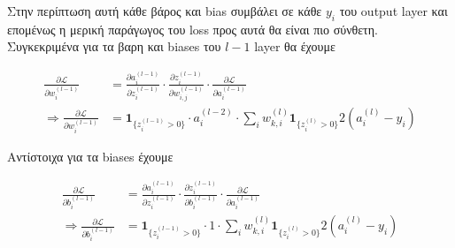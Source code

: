 \documentclass[a4paper,12pt]{article}
\begin{document}

Στην περίπτωση αυτή κάθε βάρος και bias συμβάλει σε κάθε $y_i$ του output layer και επομένως η μερική παράγωγος του loss προς αυτά θα είναι πιο σύνθετη. Συγκεκριμένα για τα βαρη και biases του $l-1$ layer θα έχουμε

\begin{align}
\frac{\partial \mathcal{L}}{\partial w_{i}^{(l-1)}}  &=  \frac{\partial a_{i}^{(l-1)}}{\partial z_{i}^{(l-1)}}  \cdot \frac{\partial z_{i}^{(l-1)}}{\partial w_{i,j}^{(l-1)}} \cdot \frac{\partial \mathcal{L}}{\partial a_{i}^{(l-1)}}  \label{eq:grad_weight1} \\
\Rightarrow \frac{\partial \mathcal{L}}{\partial w_{i}^{(l-1)}}  &= \mathbf{1}_{\{z_{i}^{(l-1)}>0\} } \cdot a_{i}^{(l-2)} \cdot \sum_{i} w_{k,i}^{(l)}\mathbf{1}_{\{z_{i}^{(l)}>0\} } 2(a_{i}^{(l)} - y_i) \label{eq:grad_weight2}
\end{align}

Αντίστοιχα για τα biases έχουμε 

\begin{align}
\frac{\partial \mathcal{L}}{\partial b_{i}^{(l-1)}}  &= \frac{\partial a_{i}^{(l-1)}}{\partial z_{i}^{(l-1)}}  \cdot \frac{\partial z_{i}^{(l-1)}}{\partial b_{i}^{(l-1)}} \cdot \frac{\partial \mathcal{L}}{\partial a_{i}^{(l-1)}} \label{eq:grad_bias1} \\
\Rightarrow \frac{\partial \mathcal{L}}{\partial b_{i}^{(l-1)}}  &= \mathbf{1}_{\{z_{i}^{(l-1)}>0\} } \cdot 1 \cdot \sum_{i} w_{k,i}^{(l)}\mathbf{1}_{\{z_{i}^{(l)}>0\} } 2(a_{i}^{(l)} - y_i) \label{eq:grad_bias2}
\end{align}
\end{document}
